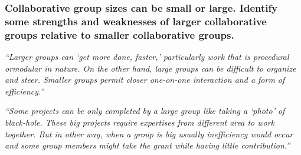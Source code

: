 \documentclass[12pt]{beamer}
\newcommand\ans[1]{{\it ``#1''}}
\newcommand\gap{\vspace{5mm}}
\begin{document}
\begin{frame} %
\frametitle{ Collaborative group sizes can be small or large. Identify some strengths and weaknesses of larger collaborative groups relative to smaller collaborative groups.
}

\ans{Larger  groups  can  `get  more  done,  faster,'  particularly  work  that  is  procedural  ormodular in nature.  On the other hand, large groups can be difficult to organize and steer.  Smaller groups permit closer one-on-one interaction and a form of efficiency.}

\gap

\ans{Some projects can be only completed by a large group like taking a `photo' of black-hole.  These big projects require expertises from different area to work together.  But in  other  way,  when  a  group  is  big  usually  inefficiency  would  occur  and  some  group members might take the grant while having little contribution.}









\end{frame}
\end{document}
